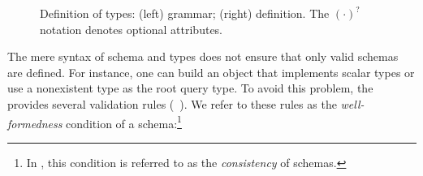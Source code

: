 \begin{figure}[h]
\begin{subfigure}{.5\textwidth}
    \end{subfigure}
    \caption{Definition of \gql types: (left) \spec grammar; 
    (right) \gcoql definition.\newline
    {\footnotesize The $(\cdot)^{?}$ notation denotes optional attributes.} 
    }
    \label{fig:types_def}
\end{figure}




The mere syntax of schema and types does not ensure that only valid schemas are defined. For instance, one can build
an object that implements scalar types or use a nonexistent type as
the root query type. To avoid this problem, the \spec provides several
validation rules (\cf~\cite[\S3]{gqlspec}). %
We refer to these rules as the \textit{well-formedness}
condition of a \gql schema:\footnote{In \HP, this condition is
  referred to as the {\em consistency} of schemas.}

